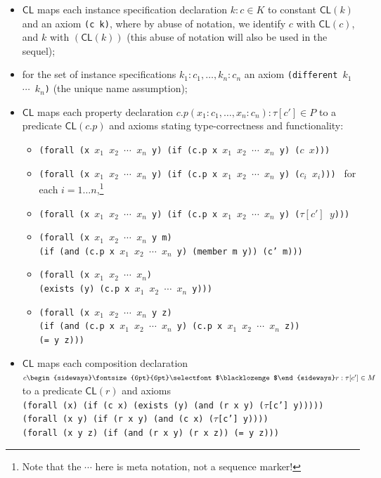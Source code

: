\documentclass[10pt,fleqn,%
\ifpretendfinal
final%
\else
draft%
\fi,
]{scrreprt}
\newcommand*{\CL}{\ensuremath{\mathsf{CL}}\xspace}
\newcommand{\composition}{\raisebox{0.2pt}{\begin{sideways}\fontsize{6pt}{6pt}\selectfont$\blacklozenge$\end{sideways}}}
\newcommand{\white}[1]{{\color{white}{#1}}}
\newcommand{\qqquad}{\white{x}\qquad}
\begin{document}
\begin{itemize}
  \item $\CL$ maps each instance specification declaration ${k : c} \in K$ to constant $\CL(k)$ and an axiom
\texttt{(c k)}, where by abuse of notation, we identify $c$ with $\CL(c)$, and $k$ with $(\CL(k))$ (this abuse of notation will also be used in the sequel);
  \item for the set of instance specifications $k_1 : c_1, \ldots, k_n : c_n$  an axiom \texttt{(different $k_1$ $\cdots$ $k_n$)} (the unique name assumption);
  \item $\CL$ maps each property declaration $c.p(x_1 : c_1, \dots, x_n : c_n)
: \tau[c'] \in P$ to a predicate $\CL(c.p)$ and axioms stating type-correctness
and functionality:
\begin{itemize}
\item
\texttt{(forall (x $x_1$ $x_2$ $\cdots$  $x_n$ y) (if (c.p x $x_1$ $x_2$ $\cdots$  $x_n$ y) ($c$ $x$))) }
\item 
\texttt{(forall (x $x_1$ $x_2$ $\cdots$  $x_n$ y) (if (c.p x $x_1$ $x_2$ $\cdots$  $x_n$ y) ($c_i$ $x_i$))) }
for each $i=1\ldots n$,\footnote{Note that the $\cdots$ here is meta notation, not a sequence marker!}
\item 
\texttt{(forall (x $x_1$ $x_2$ $\cdots$  $x_n$ y) (if (c.p x $x_1$ $x_2$ $\cdots$  $x_n$ y) ($\tau[c']$ $y$))) }
\item 
\texttt{(forall (x $x_1$ $x_2$ $\cdots$  $x_n$ y m)\\
\qqquad (if (and (c.p x $x_1$ $x_2$ $\cdots$  $x_n$ y) (member m y)) (c' m)))}
\item 
\texttt{(forall (x $x_1$ $x_2$ $\cdots$  $x_n$)}\\
\qqquad \texttt{(exists (y) (c.p x $x_1$ $x_2$ $\cdots$  $x_n$ y)))}
\item 
\texttt{(forall (x $x_1$ $x_2$ $\cdots$  $x_n$ y z)}\\
\qqquad \texttt{(if (and (c.p x $x_1$ $x_2$ $\cdots$  $x_n$ y) (c.p x $x_1$ $x_2$ $\cdots$  $x_n$ z))}\\
\qqquad\qqquad\texttt{(= y z)))}
\end{itemize}
  \item \CL maps each composition declaration ${c\composition r : \tau[c']} \in M$ to
a predicate $\CL(r)$ and axioms\\
\texttt{(forall (x) (if (c x) (exists (y) (and (r x y) ($\tau$[c'] y)))))}\\
\texttt{(forall (x y) (if (r x y) (and (c x) ($\tau$[c'] y))))}\\
\texttt{(forall (x y z) (if (and (r x y) (r x z)) (= y z)))}

\end{itemize}
\end{document}
